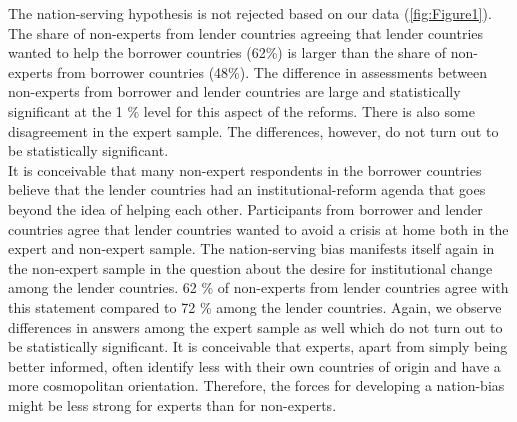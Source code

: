 The nation-serving hypothesis is not rejected based on our data (\autoref{fig:Figure1}). The share of non-experts from lender countries agreeing that lender countries wanted to help the borrower countries (62\%) is larger than the share of non-experts from borrower countries (48\%).
The difference in assessments between
non-experts from borrower and lender countries are large and statistically
significant at the 1 \% level for this aspect of the reforms. There is also some disagreement in the expert sample. The differences, however, do not turn out to be statistically significant. \\
It is conceivable that
many non-expert respondents in the borrower countries believe that
the lender countries had an institutional-reform agenda that goes beyond the
idea of helping each other. Participants from borrower and lender countries agree that lender countries wanted to avoid a crisis at home both in the expert and non-expert sample. The nation-serving bias manifests itself again in the non-expert sample in the question about the desire for institutional change among the lender countries. 62 \% of non-experts from lender countries agree with this statement compared to 72 \% among the lender countries. Again, we observe differences in answers among the expert sample as well which do not turn out to be statistically significant. 
It is conceivable that experts, apart from simply being
better informed, often identify less with their own countries of origin and have 
a more cosmopolitan orientation. Therefore, the
forces for developing a nation-bias might be less strong for experts than for non-experts. 


